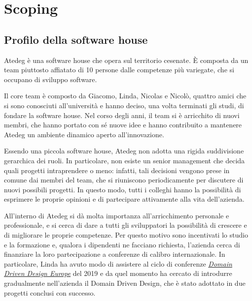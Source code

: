 \chapter{Scoping}\label{ch:scoping}

\section{Profilo della software house}\label{sec:profilo-della-software-house}
Atedeg è una software house che opera sul territorio cesenate. È composta da un team piuttosto affiatato di 10 persone dalle competenze più variegate, che si occupano di sviluppo software.

Il core team è composto da Giacomo, Linda, Nicolas e Nicolò, quattro amici che si sono conosciuti all'università e hanno deciso, una volta terminati gli studi, di fondare la software house.
Nel corso degli anni, il team si è arricchito di nuovi membri, che hanno portato con sé nuove idee e hanno contribuito a mantenere Atedeg un ambiente dinamico aperto all'innovazione.

Essendo una piccola software house, Atedeg non adotta una rigida suddivisione gerarchica dei ruoli. In particolare, non esiste un senior management che decida quali progetti intraprendere o meno: infatti, tali decisioni vengono prese in comune dai membri del team, che si riuniscono periodicamente per discutere di nuovi possibili progetti. In questo modo, tutti i colleghi hanno la possibilità di esprimere le proprie opinioni e di partecipare attivamente alla vita dell'azienda.

All'interno di Atedeg si dà molta importanza all'arricchimento personale e professionale, e si cerca di dare a tutti gli sviluppatori la possibilità di crescere e di migliorare le proprie competenze. Per questo motivo sono incentivati lo studio e la formazione e, qualora i dipendenti ne facciano richiesta, l'azienda cerca di finanziare la loro partecipazione a conferenze di calibro internazionale.
In particolare, Linda ha avuto modo di assistere al ciclo di conferenze \href{https://dddeurope.com}{\emph{Domain Driven Design Europe}} del 2019 e da quel momento ha cercato di introdurre gradualmente nell'azienda il Domain Driven Design, che è stato adottato in due progetti conclusi con successo.

